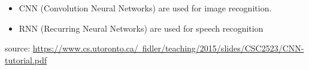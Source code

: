 \documentclass{article}
\begin{document}
\begin{itemize}
    \item CNN (Convolution Neural Networks) are used for image recognition.
    \item RNN (Recurring Neural Networks) are used for speech recognition
\end{itemize}

\small source: \href{https://www.cs.utoronto.ca/~fidler/teaching/2015/slides/CSC2523/CNN-tutorial.pdf}{https://www.cs.utoronto.ca/~fidler/teaching/2015/slides/CSC2523/CNN-tutorial.pdf}
\end{document}
